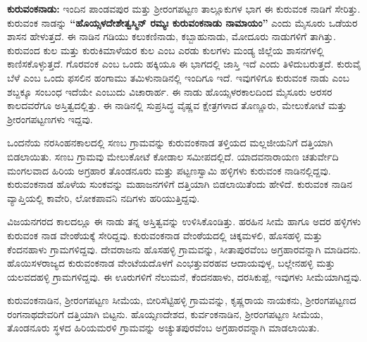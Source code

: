 \textbf{ಕುರುವಂಕನಾಡು:} ಇಂದಿನ ಪಾಂಡವಪುರ ಮತ್ತು ಶ‍್ರೀರಂಗಪಟ್ಟಣ ತಾಲ್ಲೂಕುಗಳ ಭಾಗ ಈ ಕುರುವಂಕ ನಾಡಿಗೆ ಸೇರಿತ್ತು. ಕುರುವಂಕ ನಾಡನ್ನು \textbf{“ಹೊಯ್ಸಳದೇಶೇತ್ವಸ್ಮಿನ್​ ರಮ್ಯಃ ಕುರುವಂಕನಾಡು ನಾಮಾಯಂ”} ಎಂದು ಮೈಸೂರು ಒಡೆಯರ ಶಾಸನ ಹೇಳುತ್ತದೆ. ಈ ನಾಡಿನ ಗಡಿಯು ಕಲುಕಣಿನಾಡು, ಕಬ್ಬಾಹುನಾಡು, ಮೋದೂರು ನಾಡುಗಳಿಗೆ ತಾಗಿತ್ತು. ಕುರುವಂದ ಕುಲ ಮತ್ತು ಕುರುಕಿಮಾಳೆಯರ ಕುಲ ಎಂಬ ಎರಡು ಕುಲಗಳು ಮಂಡ್ಯ ಜಿಲ್ಲೆಯ ಶಾಸನಗಳಲ್ಲಿ ಕಾಣಿಸಕೊಳ್ಳುತ್ತದೆ. ಗೊರವಂಕ ಎಂಬ ಒಂದು ಹಕ್ಕಿಯೂ ಈ ಭಾಗದಲ್ಲಿ ಜಾಸ್ತಿ ಇದೆ ಎಂದು ತಿಳಿದುಬರುತ್ತದೆ. ಕುರುವೈ ಬೆಳೆ ಎಂಬ ಒಂದು ಫಸಲಿನ ಹಂಗಾಮು ತಮಿಳುನಾಡಿನಲ್ಲಿ ಇಂದಿಗೂ ಇದೆ. ಇವುಗಳಿಗೂ ಕುರುವಂಕ ನಾಡು ಎಂಬ ಶಬ್ದಕ್ಕೂ ಸಂಬಂಧ ಇದೆಯೇ ಎಂಬುದು ವಿಚಾರಾರ್ಹ. ಈ ನಾಡು ಹೊಯ್ಸಳರಕಾಲದಿಂದ ಮೈಸೂರು ಅರಸರ ಕಾಲದವರೆಗೂ ಅಸ್ತಿತ್ವದಲ್ಲಿತ್ತು. ಈ ನಾಡಿನಲ್ಲಿ ಸುಪ್ರಸಿದ್ಧ ವೈಷ್ಣವ ಕ್ಷೇತ್ರಗಳಾದ ತೊಣ್ಣೂರು, ಮೇಲುಕೋಟೆ ಮತ್ತು ಶ‍್ರೀರಂಗಪಟ್ಟಣಗಳು ಇದ್ದವು.

ಒಂದನೆಯ ನರಸಿಂಹನಕಾಲದಲ್ಲಿ ಸಣಬ ಗ್ರಾಮವನ್ನು ಕುರುವಂಕನಾಡ ತಳ್ತಿಯದ ಮಲ್ಲಜೀಯನಿಗೆ ದತ್ತಿಯಾಗಿ ಬಿಡಲಾಯಿತು. ಸಣಬ ಗ್ರಾಮವು ಮೇಲುಕೋಟೆ ಕೋಡಾಲ ಸಮೀಪದಲ್ಲಿದೆ. ಯಾದವನಾರಾಯಣ ಚತುರ್ವೇದಿ ಮಂಗಲವಾದ ಹಿರಿಯ ಅಗ್ರಹಾರ ತೊಂಡನೂರು ಮತ್ತು ಪಟ್ಟಣಸ್ವಾಮಿ ಹಳ್ಳಿಗಳು ಕುರುವಂಕ ನಾಡಿನಲ್ಲಿದ್ದವು. ಕುರುವಂಕನಾಡ ಹೊಳೆಯ ಸುಂಕವನ್ನು ಮಹಾಜನಗಳಿಗೆ ದತ್ತಿಯಾಗಿ ಬಿಡಲಾಯಿತೆಂದು ಹೇಳಿದೆ. ಕುರುವಂಕ ನಾಡಿನ ವ್ಯಾಪ್ತಿಯಲ್ಲಿ ಕಾವೇರಿ, ಲೋಕಪಾವನಿ ನದಿಗಳು ಹರಿಯುತ್ತಿದ್ದವು.

ವಿಜಯನಗರದ ಕಾಲದಲ್ಲೂ ಈ ನಾಡು ತನ್ನ ಅಸ್ತಿತ್ವವನ್ನು ಉಳಿಸಿಕೊಂಡಿತ್ತು. ಹರಹಿನ ಸೀಮೆ ಹಾಗೂ ಅದರ ಹಳ್ಳಿಗಳು ಕುರುವಂಕ ನಾಡ ವೇಂಠೆಯಕ್ಕೆ ಸೇರಿದ್ದವು. ಕುರುವಂಕನಾಡ ವೇಂಠೆಯದಲ್ಲಿ ಚಿಕ್ಕಮಳಲಿ, ಹೊಸಹಳ್ಳಿ ಮತ್ತು ಕೆಂದನಹಾಳು ಗ್ರಾಮಗಳಿದ್ದವು. ದೇವರಾಜನು ಹೊಸಹಳ್ಳಿ ಗ್ರಾಮವನ್ನು, ಸೀತಾಪುರವೆಂಬ ಅಗ್ರಹಾರವನ್ನಾಗಿ ಮಾಡಿದನು. ಹೊಯಿಸಳರಾಜ್ಯದ ಕುರುವಂಕನಾಡ ವೇಂಟೆಯದೊಳಗೆ ಎಂಭತ್ತುವರಹವ ಆದಾಯವುಳ್ಳ, ಬಲ್ಲೇನಹಳ್ಳಿ ಮತ್ತು ಯಲವದಹಳ್ಳಿ ಗ್ರಾಮಗಳಿದ್ದವು. ಈ ಊರುಗಳಿಗೆ ನೆಲುಮನೆ, ಕೆಂದನಹಾಳು, ದರಸಿಕುಪ್ಪೆ, ಇವುಗಳು ಸೀಮೆಯಾಗಿದ್ದವು.

ಕುರುವಂಕನಾಡಿನ, ಶ‍್ರೀರಂಗಪಟ್ಟಣ ಸೀಮೆಯ, ಬೀರಿಸೆಟ್ಟಿಹಳ್ಳಿ ಗ್ರಾಮವನ್ನು, ಕೃಷ್ಣರಾಯ ನಾಯಕನು, ಶ‍್ರೀರಂಗಪಟ್ಟಣದ ರಂಗನಾಥದೇವರಿಗೆ ದತ್ತಿಯಾಗಿ ಬಿಟ್ಟನು. ಹೊಯ್ಸಣದೇಶದ, ಕುರ್ವಂಕನಾಡಿನ, ಶ‍್ರೀರಂಗಪಟ್ಟಣ ಸೀಮೆಯ, ತೊಂಡನೂರು ಸ್ಥಳದ ಹಿರಿಯಮರಳಿ ಗ್ರಾಮವನ್ನು ಅಚ್ಯುತಪುರವೆಂಬ ಅಗ್ರಹಾರವನ್ನಾಗಿ ಮಾಡಲಾಯಿತು.


